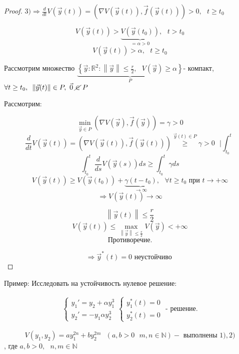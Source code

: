 \documentclass[12pt, a4paper]{report}
\begin{document}
\begin{proof}
\( 3) \Rightarrow \displaystyle  \frac{d}{dt }  V(\vec{y}  (t))  = (\nabla V(\vec{y }  (t ) ) , \vec{f }  (\vec{y}(t) )) > 0 ,\text{ }  t \ge  t_0 \) 

\[ V(\vec{y } (t )) > \underbrace{V (\vec{y } (t_0))}_{= \alpha > 0} ,\text{ } t> t_0 \] 
\[ V(\vec{y}  (t) ) > \alpha , \text{ }  t \ge  t_0 \] 

Рассмотрим множество \( \displaystyle  \underbrace{\left\{   \vec{ y}  : \mathbb{R} ^2 : \left\lVert \vec{y}  \right\rVert \le  \frac{r}{2 }  , \text{ }  V(\vec{y } ) \ge  \alpha \right\}}_{P}\)- компакт, \( \forall  t \ge  t_0 , \text{ }  \left\lVert \vec{y}(t)  \right\rVert \in  P , \text{ } \vec{0 }\text{ }  \cancel{\in  } \text{ } P\)  

Рассмотрим: 

\[ \min_{\vec{y } \in  P } (\nabla V (\vec{y}  ) , \vec{f } (\vec{y} )) = \gamma > 0   \] 
\[ \frac{d}{dt  } V(\vec{y }(t)  ) = (\nabla V(\vec{y} (t)) , \vec{f }  (\vec{y } (t)))\overset{\vec{y} (t) \in  P}{ \ge}  \gamma > 0 \text{ }  \bigg | \int_{t_0}^{t}     \] 
\[ \int_{t_0}^{t } \frac{d}{ds }  V(\vec{y} (s )) ds \ge  \int_{t_0}^{t } \gamma ds    \] 
\[ V(\vec{y } (t )) \ge  V(\vec{y } (t_0)) + \underbrace{\gamma (t -t_0 )}_{\to  \infty } , \text{ }  \forall  t \ge  t_0 \text{ при } t \to  +\infty \] 
\[ \Rightarrow V(\vec{y} (t)) \to  \infty  \] 

\[ \left\lVert  \vec{y} (t) \right\rVert \le  \frac{r}{2 }  \] 
\[ V(\vec{y} (t )) \le  \max _{\left\lVert  \vec{y}  \right\rVert \le  \frac{r}{2 } } V(\vec{y} ) < + \infty   \] 
\[ \text{Противоречие.}  \] 

\[ \Rightarrow \vec{y } ^* (t ) = 0  \text{ неустойчиво } \] 

\end{proof}

Пример: Исследовать на устойчивость нулевое решение: 

\[ \begin{aligned}
    \begin{cases}
        y_1 ' =y_2 + \alpha y_1 ^3  \\ 
        y_2 ' = -y_1 \alpha y_2 ^3
    \end{cases} 
    \begin{cases}
    y_1^* (t ) = 0 \\
    y_2^* (t ) = 0
    \end{cases}
    \text{ - решение.} 
\end{aligned}\] 


\[ V(y_1,y_2 ) = a y_1 ^{2n }  + b y_2 ^{2 m }  \text{ }  (a,b > 0 \text{ }  m  , n \in \mathbb{N}) -\text{ выполнены } 1),2) \] 
, где \( a , b > 0 , \text{ }  n , m \in  \mathbb{N} \) 
\end{document}
